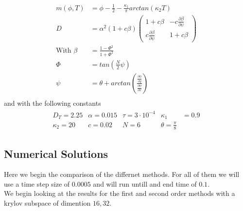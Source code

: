 \begin{align*}
    m(\phi, T) &= \phi - \frac 12 - \frac{\kappa_1}{\pi}arctan(\kappa_2 T)\\
    D &= \alpha^2(1+c\beta)
    \begin{pmatrix}
        1+c\beta & -c\frac{\partial\beta}{\partial\psi}\\
        c\frac{\partial\beta}{\partial\psi} & 1+c\beta
    \end{pmatrix}\\
    \text{With }\beta &= \frac{1-\Phi^2}{1+\Phi^2}\\
    \Phi &= tan(\frac N2\psi)\\
    \psi &= \theta + arctan(\frac{\frac{\partial \phi}{\partial y}}{\frac{\partial \phi}{\partial x}})\\
\end{align*}
and with the following constants
\begin{align*}
    \begin{matrix}
    D_T = 2.25 & \alpha = 0.015 & \tau = 3\cdot 10^{-4} & \kappa_1 &= 0.9\\
    \kappa_2 = 20 & c = 0.02 & N = 6 & \theta = \frac{\pi}8
    \end{matrix}
\end{align*}

\subsection{Numerical Solutions}
Here we begin the comparison of the differnet methods.
For all of them we will use a time step size of $0.0005$ and will run untill and end time of $0.1$.\\

We begin looking at the results for the first and second order methods with a krylov subspace of dimention $16, 32$.

